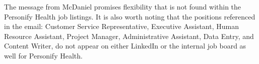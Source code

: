 \begin{fullwidth}
The message from McDaniel promises flexibility that is not found within the Personify Health job listings. It is also worth noting that the positions referenced in the email: Customer Service Representative, Executive Assistant, Human Resource Assistant, Project Manager, Administrative Assistant, Data Entry, and Content Writer, do not appear on either LinkedIn or the internal job board as well for Personify Health.
\end{fullwidth}
